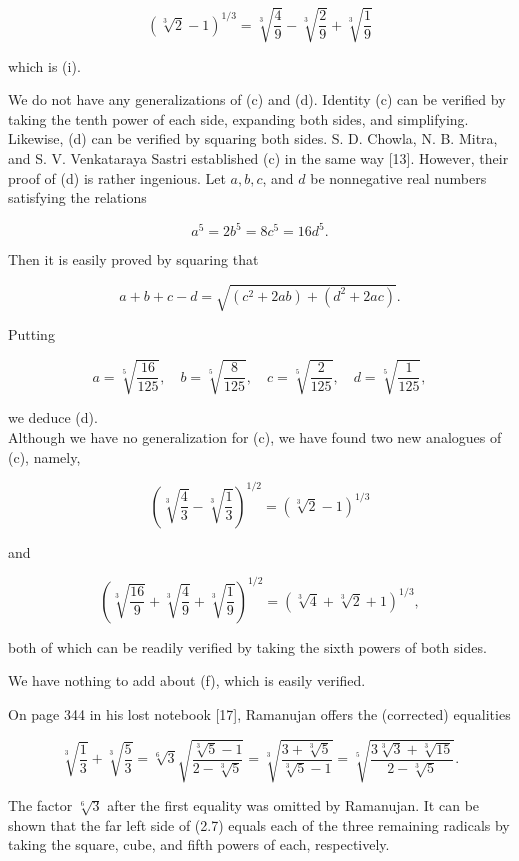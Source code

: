 \documentclass[11pt,letterpaper]{article}
\begin{document}
\[
(\sqrt[3]{2}-1)^{1 / 3}=\sqrt[3]{\frac{4}{9}}-\sqrt[3]{\frac{2}{9}}+\sqrt[3]{\frac{1}{9}}
\]

which is (i).


We do not have any generalizations of (c) and (d). Identity (c) can be verified by taking the tenth power of each side, expanding both sides, and simplifying. Likewise, (d) can be verified by squaring both sides. S. D. Chowla, N. B. Mitra, and S. V. Venkataraya Sastri established (c) in the same way [13]. However, their proof of (d) is rather ingenious. Let $a, b, c$, and $d$ be nonnegative real numbers satisfying the relations

\[
a^{5}=2 b^{5}=8 c^{5}=16 d^{5} .
\]

Then it is easily proved by squaring that

\[
a+b+c-d=\sqrt{\left(c^{2}+2 a b\right)+\left(d^{2}+2 a c\right)} .
\]

Putting

\[
a=\sqrt[5]{\frac{16}{125}}, \quad b=\sqrt[5]{\frac{8}{125}}, \quad c=\sqrt[5]{\frac{2}{125}}, \quad d=\sqrt[5]{\frac{1}{125}},
\]

we deduce (d).\\
Although we have no generalization for (c), we have found two new analogues of (c), namely,

\[
\left(\sqrt[3]{\frac{4}{3}}-\sqrt[3]{\frac{1}{3}}\right)^{1 / 2}=(\sqrt[3]{2}-1)^{1 / 3}
\]

and

\[
\left(\sqrt[3]{\frac{16}{9}}+\sqrt[3]{\frac{4}{9}}+\sqrt[3]{\frac{1}{9}}\right)^{1 / 2}=(\sqrt[3]{4}+\sqrt[3]{2}+1)^{1 / 3},
\]

both of which can be readily verified by taking the sixth powers of both sides.

We have nothing to add about (f), which is easily verified.


On page 344 in his lost notebook [17], Ramanujan offers the (corrected) equalities


\begin{equation*}
\sqrt[3]{\frac{1}{3}}+\sqrt[3]{\frac{5}{3}}=\sqrt[6]{3} \sqrt{\frac{\sqrt[3]{5}-1}{2-\sqrt[3]{5}}}=\sqrt[3]{\frac{3+\sqrt[3]{5}}{\sqrt[3]{5}-1}}=\sqrt[5]{\frac{3 \sqrt[3]{3}+\sqrt[3]{15}}{2-\sqrt[3]{5}}} . \tag{2.7}\label{eq:2.7}
\end{equation*}


The factor $\sqrt[6]{3}$ after the first equality was omitted by Ramanujan. It can be shown that the far left side of (2.7) equals each of the three remaining radicals by taking the square, cube, and fifth powers of each, respectively.
\end{document}

